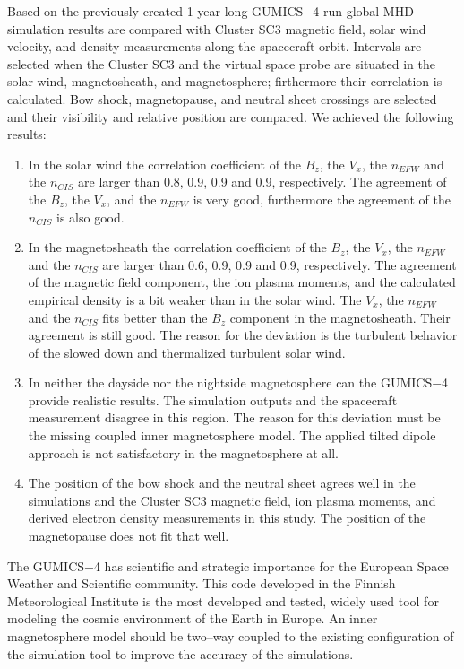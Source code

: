 \documentclass[b5paper,10pt]{article}
\begin{document}
Based on the previously created 1-year long GUMICS$-$4 run global MHD simulation results are compared with Cluster SC3 magnetic field, solar wind velocity, and density measurements along the spacecraft orbit. Intervals are selected when the Cluster SC3 and the virtual space probe are situated in the solar wind, magnetosheath, and magnetosphere; firthermore their correlation is calculated. Bow shock, magnetopause, and neutral sheet crossings are selected and their visibility and relative position are compared. We achieved the following results:
\begin{enumerate}
  \setlength{\parskip}{-3pt}
\item In the solar wind the correlation coefficient of the $B_{z}$, the $V_{x}$, the $n_{EFW}$ and the $n_{CIS}$ are larger than 0.8, 0.9, 0.9 and 0.9, respectively. The agreement of the $B_{z}$, the $V_{x}$, and the $n_{EFW}$ is very good, furthermore the agreement of the $n_{CIS}$ is also good. 
\item In the magnetosheath the correlation coefficient of the $B_{z}$, the $V_{x}$, the $n_{EFW}$ and the $n_{CIS}$ are larger than 0.6, 0.9, 0.9 and 0.9, respectively. The agreement of the magnetic field component, the ion plasma moments, and the calculated empirical density is a bit weaker than in the solar wind. The $V_{x}$, the $n_{EFW}$ and the $n_{CIS}$ fits better than the $B_{z}$ component in the magnetosheath. Their agreement is still good. The reason for the deviation is the turbulent behavior of the slowed down and thermalized turbulent solar wind.
\item In neither the dayside nor the nightside magnetosphere can the GUMICS$-$4 provide realistic results. The simulation outputs and the spacecraft measurement disagree in this region. The reason for this deviation must be the missing coupled inner magnetosphere model. The applied tilted dipole approach is not satisfactory in the magnetosphere at all. 
\item The position of the bow shock and the neutral sheet agrees well in the simulations and the Cluster SC3 magnetic field, ion plasma moments, and derived electron density measurements in this study. The position of the magnetopause does not fit that well.
\end{enumerate}
The GUMICS$-$4 has scientific and strategic importance for the European Space Weather and Scientific community. This code developed in the Finnish Meteorological Institute is the most developed and tested, widely used tool for modeling the cosmic environment of the Earth in Europe. An inner magnetosphere model should be two--way coupled to the existing configuration of the simulation tool to improve the accuracy of the simulations.
\end{document}
